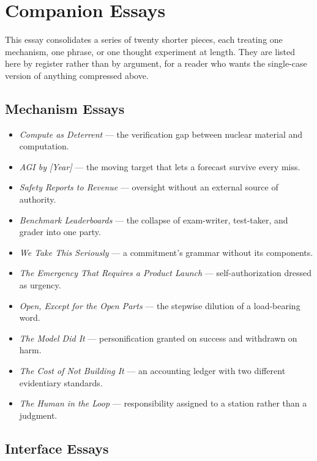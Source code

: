 \documentclass[11pt]{article}
\begin{document}
\section*{Companion Essays}

This essay consolidates a series of twenty shorter pieces, each treating one mechanism, one phrase, or one thought experiment at length. They are listed here by register rather than by argument, for a reader who wants the single-case version of anything compressed above.

\subsection*{Mechanism Essays}

\begin{itemize}
  \item \textit{Compute as Deterrent} --- the verification gap between nuclear material and computation.
  \item \textit{AGI by [Year]} --- the moving target that lets a forecast survive every miss.
  \item \textit{Safety Reports to Revenue} --- oversight without an external source of authority.
  \item \textit{Benchmark Leaderboards} --- the collapse of exam-writer, test-taker, and grader into one party.
  \item \textit{We Take This Seriously} --- a commitment's grammar without its components.
  \item \textit{The Emergency That Requires a Product Launch} --- self-authorization dressed as urgency.
  \item \textit{Open, Except for the Open Parts} --- the stepwise dilution of a load-bearing word.
  \item \textit{The Model Did It} --- personification granted on success and withdrawn on harm.
  \item \textit{The Cost of Not Building It} --- an accounting ledger with two different evidentiary standards.
  \item \textit{The Human in the Loop} --- responsibility assigned to a station rather than a judgment.
\end{itemize}

\subsection*{Interface Essays}
\end{document}
